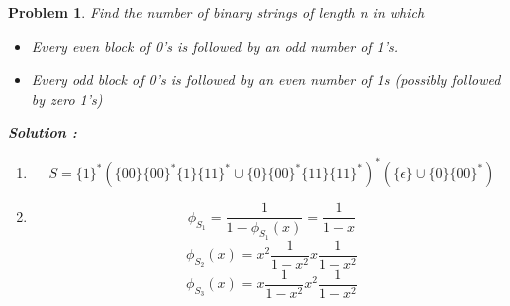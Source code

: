 \documentclass{article}
\newtheorem{expx}[theorem]{Problem}
\begin{document}
\begin{expx}
Find the number of binary strings of length n in which 
\begin{itemize}
\item Every even block of 0's is followed by an odd number of 1's.
\item Every odd block of 0's is followed by  an even number of 1s (possibly followed by zero 1's) 
\end{itemize}

\textbf{Solution : }
\begin{enumerate}
\item \[S = \{1\}^* (\{00\}\{00\}^*\{1\}\{11\}^*\cup \{0\}\{00\}^*\{11\}\{11\}^*)^* (\{\epsilon\} \cup \{0\}\{00\}^*)\]
\item \[\phi_{S_1} = \frac{1}{ 1- \phi_{S_1}(x)} = \frac{1}{1-x}\]
\[\phi_{S_2} (x) = x^2 \frac{1}{1-x^2} x \frac{1}{1-x^2}\]
\[\phi_{S_3} (x) = x \frac{1}{1-x^2} x^2 \frac{1}{1-x^2}\]

\end{enumerate}
\end{expx}
\end{document}
